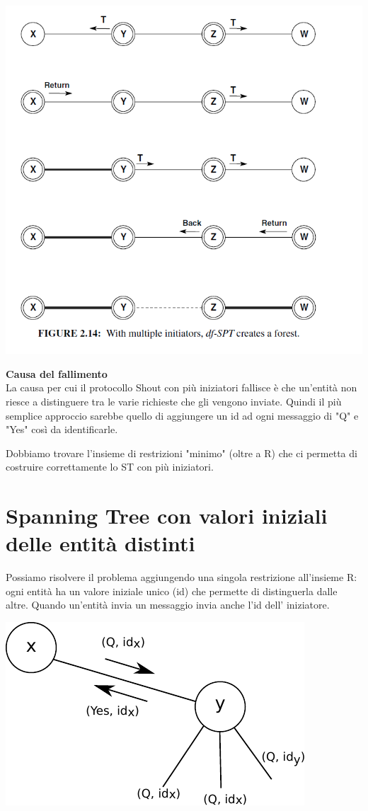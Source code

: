 \begin{center}
    \includegraphics[scale=0.6]{capitoli/attraversamento/imgs/asd.png}
\end{center}

\textbf{Causa del fallimento}\\
La causa per cui il protocollo Shout con più iniziatori fallisce è che un'entità
non riesce a distinguere tra le varie richieste che gli vengono inviate. Quindi
il più semplice approccio sarebbe quello di aggiungere un id ad ogni messaggio
di "Q" e "Yes" così da identificarle.

Dobbiamo trovare l'insieme di restrizioni "minimo" (oltre a R) che ci permetta
di costruire correttamente lo ST con più iniziatori.

\section{Spanning Tree con valori iniziali delle entità distinti}
Possiamo risolvere il problema aggiungendo una singola restrizione all'insieme
R: ogni entità ha un valore iniziale unico (id) che permette di distinguerla
dalle altre. Quando un'entità invia un messaggio invia anche l'id dell'
iniziatore.

\begin{center}
    \includegraphics[scale=0.8]{capitoli/costruzione-spanning-tree/imgs/n_38}
\end{center}

